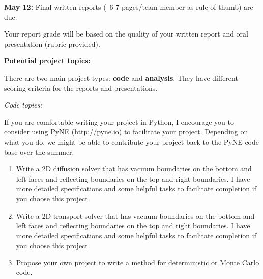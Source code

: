 \documentclass[12pt]{article}
\begin{document}
\vspace*{2 em}
\textbf{May 12:} Final written reports (~6-7 pages/team member as rule of thumb) are due.

\vspace*{2 em}
Your report grade will be based on the quality of your written report and oral presentation (rubric provided). 

\clearpage 
\begin{center}
\textbf{Potential project topics:}
\end{center}
There are two main project types: \textbf{code} and \textbf{analysis}. They have different scoring criteria for the reports and presentations.

\begin{center}
\textit{Code topics:}
\end{center}
If you are comfortable writing your project in Python, I encourage you to consider using PyNE (\href{http://pyne.io}{http://pyne.io}) to facilitate your project. Depending on what you do, we might be able to contribute your project back to the PyNE code base over the summer.

\begin{enumerate}
\item Write a 2D diffusion solver that has vacuum boundaries on the bottom and left faces and reflecting boundaries on the top and right boundaries. I have more detailed specifications and some helpful tasks to facilitate completion if you choose this project. 

\item Write a 2D transport solver that has vacuum boundaries on the bottom and left faces and reflecting boundaries on the top and right boundaries. I have more detailed specifications and some helpful tasks to facilitate completion if you choose this project. 



\item Propose your own project to write a method for deterministic or Monte Carlo code. 
\end{enumerate}
\end{document}
